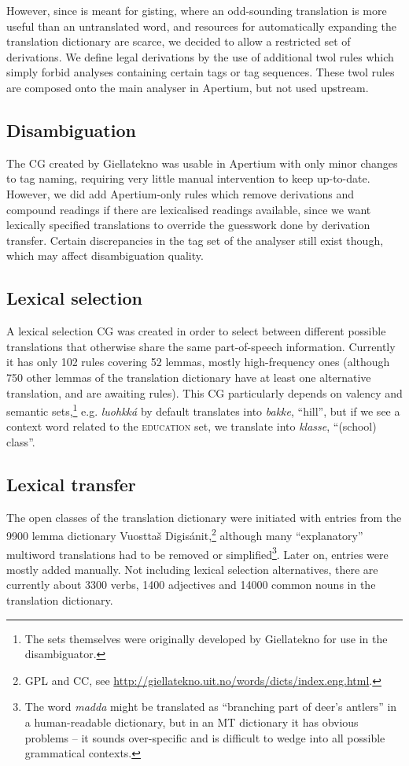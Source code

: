 \documentclass{book}
\begin{document}
However, since \smenob{} is meant for gisting, where an odd-sounding
translation is more useful than an untranslated word, and resources
for automatically expanding the translation dictionary are scarce, we
decided to allow a restricted set of derivations. We define legal
derivations by the use of additional twol rules which simply forbid
analyses containing certain tags or tag sequences. These twol rules
are composed onto the main analyser in Apertium, but not used
upstream.

\subsection{Disambiguation}
The CG created by Giellatekno was usable in Apertium with only minor
changes to tag naming, requiring very little manual intervention to
keep up-to-date. However, we did add Apertium-only rules which remove
derivations and compound readings if there are lexicalised readings
available, since we want lexically specified translations to override
the guesswork done by derivation transfer. Certain discrepancies in
the tag set of the analyser still exist though, which may affect
disambiguation quality.

\subsection{Lexical selection}
A lexical selection CG was created in order to select between
different possible translations that otherwise share the same
part-of-speech information. Currently it has only 102 rules covering
52 lemmas, mostly high-frequency ones (although 750 other lemmas of
the translation dictionary have at least one alternative translation,
and are awaiting rules). This CG particularly depends on valency and
semantic sets,\footnote{The sets themselves were originally developed
  by Giellatekno for use in the disambiguator.} e.g.
\textit{luohkk\'{a}} by default translates into \textit{bakke},
``hill'', but if we see a context word related to the
\textsc{education} set, we translate into \textit{klasse}, ``(school)
class''.


\subsection{Lexical transfer}
The open classes of the translation dictionary were initiated with
entries from the 9900 lemma dictionary Vuostta\v{s}
Digis\'{a}nit,\footnote{GPL and CC, see
  \href{http://giellatekno.uit.no/words/dicts/index.eng.html}{http://giellatekno.uit.no/words/dicts/index.eng.html}.}
although many ``explanatory'' multiword translations had to be removed
or simplified\footnote{The word \textit{madda} might be translated as
  ``branching part of deer's antlers'' in a human-readable dictionary,
  but in an MT dictionary it has obvious problems -- it sounds
  over-specific and is difficult to wedge into all possible
  grammatical contexts.}. Later on, entries were mostly added
manually. Not including lexical selection alternatives, there are
currently about 3300 verbs, 1400 adjectives and 14000 common nouns in
the translation dictionary.
\end{document}
